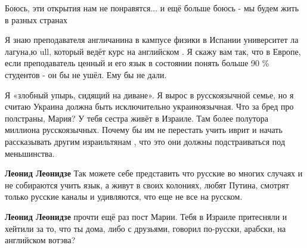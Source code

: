 \begin{itemize}
\begin{itemize}
\end{itemize}

 
Боюсь, эти открытия нам не понравятся... и ещё больше боюсь - мы будем жить в разных странах

 

Я знаю преподавателя англичанина в кампусе физики в Испании университет ла
лагуна,ю ull, который ведёт курс на английском . Я скажу вам так, что в Европе,
если преподаватель ценный и его язык в состоянии понять больше 90 \% студентов -
он бы не ушёл. Ему бы не дали.


Я «злобный упырь, сидящий на диване». Я вырос в русскоязычной семье, но я
считаю Украина должна быть исключительно украиноязычная. Что за бред про
полстраны, Мария? У тебя сестра живёт в Израиле. Там более полутора миллиона
русскоязычных. Почему бы им не перестать учить иврит и начать рассказывать
другим израильтянам , что это они должны подстраиваться под меньшинства.

\begin{itemize}
 
\textbf{Леонид Леонидзе} Так можете себе представить что русские во многих случаях и не собираются учить язык, а живут в своих колониях, любят Путина, смотрят только русские каналы и удивляются, что еще не все на русском.

 
\textbf{Леонид Леонидзе} прочти ещё раз пост Марии. Тебя в Израиле притесняли и хейтили за то, что ты дома, либо с друзьями, говорил по-русски, арабски, на английском вотэва?


\end{itemize}
\end{itemize}
